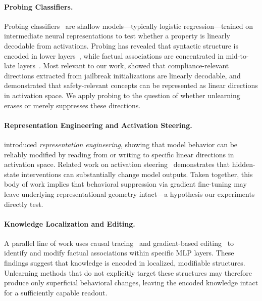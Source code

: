 \paragraph{Probing Classifiers.}
Probing classifiers~\citep{alain2017understanding} are shallow models---typically
logistic regression---trained on intermediate neural representations to test whether
a property is linearly decodable from activations.
Probing has revealed that syntactic structure is encoded in lower
layers~\citep{hewitt2019structural}, while factual associations are concentrated in
mid-to-late layers~\citep{meng2022locating}.
Most relevant to our work, \citet{levi2025jailbreak} showed that compliance-relevant
directions extracted from jailbreak initializations are linearly decodable, and
\citet{zou2023representation} demonstrated that safety-relevant concepts can be
represented as linear directions in activation space.
We apply probing to the question of whether unlearning erases or merely suppresses
these directions.

\paragraph{Representation Engineering and Activation Steering.}
\citet{zou2023representation} introduced \emph{representation engineering}, showing
that model behavior can be reliably modified by reading from or writing to specific
linear directions in activation space.
Related work on activation steering~\citep{turner2023activation} demonstrates that
hidden-state interventions can substantially change model outputs.
Taken together, this body of work implies that behavioral suppression via gradient
fine-tuning may leave underlying representational geometry intact---a hypothesis our
experiments directly test.

\paragraph{Knowledge Localization and Editing.}
A parallel line of work uses causal tracing~\citep{meng2022locating} and
gradient-based editing~\citep{meng2022mass} to identify and modify factual
associations within specific MLP layers.
These findings suggest that knowledge is encoded in localized, modifiable structures.
Unlearning methods that do not explicitly target these structures may therefore
produce only superficial behavioral changes, leaving the encoded knowledge intact
for a sufficiently capable readout.
